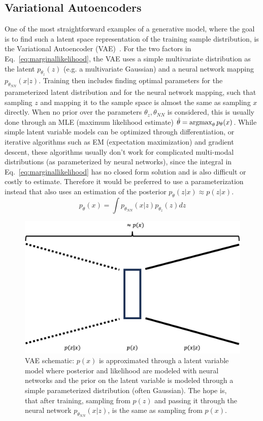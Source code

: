 \subsection{Variational Autoencoders}
One of the most straightforward examples of a generative model, where the goal is to find such a latent space representation of the training sample distribution, is the Variational Autoencoder (VAE)~\autocite{kingma2013autoencoding}. For the two factors in Eq.~\ref{eq:marginallikelihood}, the VAE uses a simple multivariate distribution as the latent $p_{\theta_z}(z)$ (e.g. a multivariate Gaussian) and a neural network mapping $p_{\theta_{NN}}(x|z)$. Training then includes finding optimal parameters for the parameterized latent distribution and for the neural network mapping, such that sampling $z$ and mapping it to the sample space is almost the same as sampling $x$ directly. When no prior over the parameters $\theta_z, \theta_{NN}$ is considered, this is usually done through an MLE (maximum likelihood estimate) $\hat{\theta} = \operatorname*{argmax}_{\theta} p_{\theta}(x)$. While simple latent variable models can be optimized through differentiation, or iterative algorithms such as EM (expectation maximization) and gradient descent, these algorithms usually don't work for complicated multi-modal distributions (as parameterized by neural networks), since the integral in Eq.~\ref{eq:marginallikelihood} has no closed form solution and is also difficult or costly to estimate. Therefore it would be preferred to use a parameterization instead that also uses an estimation of the posterior $p_{\theta}(z|x) \approx p(z|x)$.
\begin{equation}
    \label{eq:likelihoodvae}
    p_{\theta}(x) = \int p_{\theta_{NN}}(x|z) p_{\theta_z}(z) dz
\end{equation}
\begin{figure}[h]
    \centering
    \includegraphics[width=.5\textwidth]{images/vae.png}
    \caption[VAE schematic]{VAE schematic: $p(x)$ is approximated through a latent variable model where posterior and likelihood are modeled with neural networks and the prior on the latent variable is modeled through a simple parameterized distribution (often Gaussian). The hope is, that after training, sampling from $p(z)$ and passing it through the neural network $p_{\theta_{NN}}(x|z)$, is the same as sampling from $p(x)$.}
    \label{fig:vae}
\end{figure}
